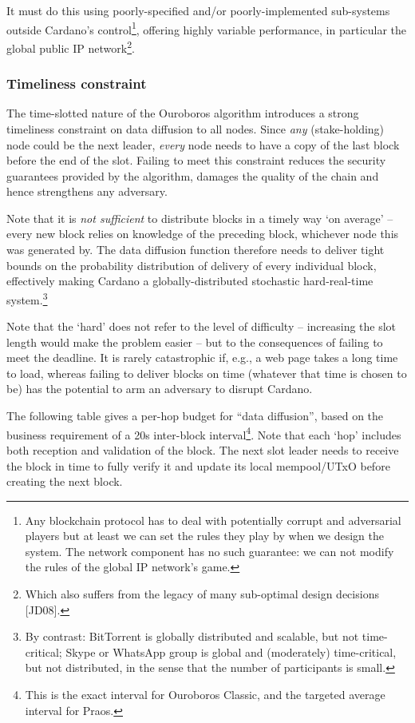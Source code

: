 \documentclass[11pt,a4paper]{article}
\begin{document}
It must do this using poorly-specified and/or poorly-implemented
sub-systems outside Cardano's control\footnote{Any blockchain protocol
  has to deal with potentially corrupt and adversarial players but at
  least we can set the rules they play by when we design the system. The
  network component has no such guarantee: we can not modify the rules
  of the global IP network's game.}, offering highly variable
performance, in particular the global public IP network\footnote{Which
  also suffers from the legacy of many sub-optimal design decisions
  {[}JD08{]}.}.

\subsubsection{Timeliness constraint}
\label{timeliness-constraint}

The time-slotted nature of the Ouroboros algorithm introduces a strong
timeliness constraint on data diffusion to all nodes. Since \emph{any}
(stake-holding) node could be the next leader, \emph{every} node needs
to have a copy of the last block before the end of the slot. Failing to
meet this constraint reduces the security guarantees provided by the
algorithm, damages the quality of the chain and hence strengthens any
adversary.

Note that it is \emph{not sufficient} to distribute blocks in a timely
way `on average' -- every new block relies on knowledge of the preceding
block, whichever node this was generated by. The data diffusion function
therefore needs to deliver tight bounds on the probability distribution
of delivery of every individual block, effectively making Cardano a
globally-distributed stochastic hard-real-time system.\footnote{By
  contrast: BitTorrent is globally distributed and scalable, but not
  time-critical; Skype or WhatsApp group is global and (moderately)
  time-critical, but not distributed, in the sense that the number of
  participants is small.}

Note that the `hard' does not refer to the level of difficulty --
increasing the slot length would make the problem easier -- but to the
consequences of failing to meet the deadline. It is rarely catastrophic
if, e.g., a web page takes a long time to load, whereas failing to
deliver blocks on time (whatever that time is chosen to be) has the
potential to arm an adversary to disrupt Cardano.

The following table gives a per-hop budget for ``data diffusion'', based
on the business requirement of a 20s inter-block interval\footnote{This
  is the exact interval for Ouroboros Classic, and the targeted average
  interval for Praos.}. Note that each `hop' includes both reception and
validation of the block. The next slot leader needs to receive the block
in time to fully verify it and update its local mempool/UTxO before
creating the next block.
\end{document}
